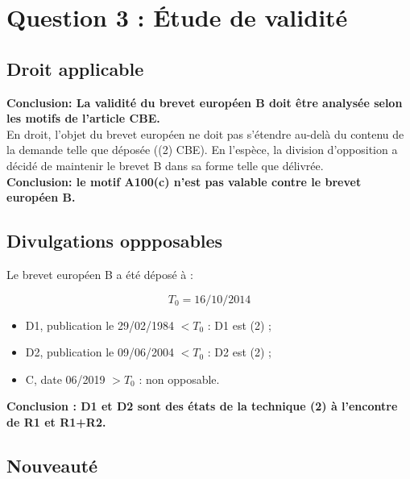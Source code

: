 \section{Question 3 : Étude de validité}

\subsection{Droit applicable}

\textbf{Conclusion: La validité du brevet européen B doit être analysée
selon les motifs de l’article  CBE.}\\


En droit, l’objet du brevet européen ne doit pas s’étendre au-delà du contenu
de la demande telle que déposée ((2) CBE).
En l’espèce, la division d’opposition a décidé de maintenir le brevet B
dans sa forme telle que délivrée.\\

\textbf{Conclusion: le motif A100(c)
 n’est pas valable contre le brevet européen B.}

\subsection{Divulgations oppposables}

Le brevet européen B a été déposé à :

\[
T_0 = 16/10/2014
\]

\begin{itemize}
  \item D1, publication le 29/02/1984 $< T_0$ : D1 est (2) ;
  \item D2, publication le 09/06/2004 $< T_0$ : D2 est (2) ;
  \item C, date 06/2019 $> T_0$ : non opposable.\\
\end{itemize}

\textbf{Conclusion : D1 et D2 sont des états de la technique (2)
à l’encontre de R1 et R1+R2.}

\clearpage
\subsection{Nouveauté}

